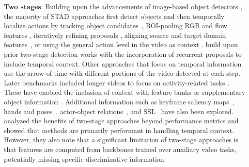 
\noindent
\textbf{Two stages}. Building upon the advancements of image-based object detectors \citep{girshick2014rich,girshick2015fast}, the majority of STAD approaches first detect objects and then temporally localize actions by tracking object candidates~\citep{jain2014action,weinzaepfel2015learning}, ROI-pooling RGB and flow features \citep{peng2016multi}, iteratively refining proposals \citep{soomro2015action}, aligning source and target domain features~\citep{agarwal2020unsupervised}, or using the general action level in the video as context \citep{mettes2016spot}. \citet{li2018recurrent} build upon prior two-stage detection works with the incorporation of recurrent proposals to include temporal context. Other approaches that focus on temporal information \citet{singh2017online} use the arrow of time with different portions of the video detected at each step. Later benchmarks included longer videos to focus on activity-related tasks \citep{gu2018ava}. These have enabled the inclusion of context with feature banks \citep{feng2021relation,pan2021actor,tang2020asynchronous,wang2018videos,wu2019long,wu2022memvit} or supplementary object information \citep{arnab2021unified,hou2017tube,zhang2019structured}. Additional information such as keyframe saliency maps~\citep{li2020actions,ulutan2020actor}, hands and poses~\citep{faure2023holistic}, actor-object relations~\citep{sun2018actor}, and SSL~\citep{wang2023videomae} have also been explored. \citet{alwassel2018diagnosing} analyzed the benefits of two-stage approaches beyond performance metrics and showed that methods are primarily performant in handling temporal context. However, they also note that a significant limitation of two-stage approaches is that features are computed from backbones trained over auxiliary video tasks, potentially missing specific discriminative information.




